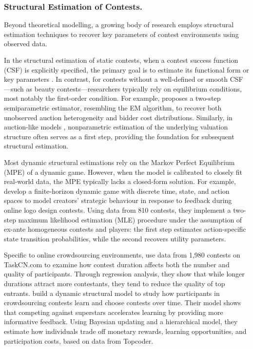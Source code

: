 \documentclass[mnsc]{informs3}
\begin{document}
\subsubsection{Structural Estimation of Contests.}

Beyond theoretical modelling, a growing body of research employs structural estimation techniques to recover key parameters of contest environments using observed data.

In the structural estimation of static contests, when a contest success function (CSF) is explicitly specified, the primary goal is to estimate its functional form or key parameters \citep{hwang2012technology, kang2016policy, huang2021structural}.
In contrast, for contests without a well-defined or smooth CSF—such as beauty contests—researchers typically rely on equilibrium conditions, most notably the first-order condition.
For example, \citet{yoganarasimhan2016estimation} proposes a two-step semiparametric estimator, resembling the EM algorithm, to recover both unobserved auction heterogeneity and bidder cost distributions.
Similarly, in auction-like models \citep{guerre2000optimal, shakhgildyan2022nonparametric}, nonparametric estimation of the underlying valuation structure often serves as a first step, providing the foundation for subsequent structural estimation.

Most dynamic structural estimations rely on the Markov Perfect Equilibrium (MPE) of a dynamic game. 
However, when the model is calibrated to closely fit real-world data, the MPE typically lacks a closed-form solution.
For example, \citet{jiang2022role} develop a finite-horizon dynamic game with discrete time, state, and action spaces to model creators’ strategic behaviour in response to feedback during online logo design contests.
Using data from 810 contests, they implement a two-step maximum likelihood estimation (MLE) procedure under the assumption of ex-ante homogeneous contests and players: the first step estimates action-specific state transition probabilities, while the second recovers utility parameters.

Specific to online crowdsourcing environments, 
\citet{chen2021attracting} use data from 1,980 contests on TaskCN.com to examine how contest duration affects both the number and quality of participants.
Through regression analysis, they show that while longer durations attract more contestants, they tend to reduce the quality of top entrants.
\citet{zhang2019structural} build a dynamic structural model to study how participants in crowdsourcing contests learn and choose contests over time.
Their model shows that competing against superstars accelerates learning by providing more informative feedback.
Using Bayesian updating and a hierarchical model, they estimate how individuals trade off monetary rewards, learning opportunities, and participation costs, based on data from Topcoder.
\end{document}
